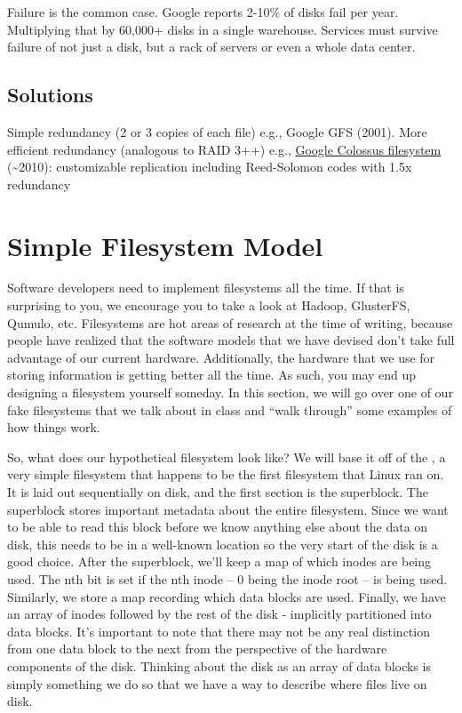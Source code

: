 Failure is the common case.
Google reports 2-10\% of disks fail per year.
Multiplying that by 60,000+ disks in a single warehouse.
Services must survive failure of not just a disk, but a rack of servers or even a whole data center.

\subsection{Solutions}
Simple redundancy (2 or 3 copies of each file) e.g., Google GFS (2001).
More efficient redundancy (analogous to RAID 3++) e.g., \href{http://goo.gl/LwFIy}{Google Colossus filesystem} (\textasciitilde{}2010): customizable replication including Reed-Solomon codes with 1.5x redundancy

\section{Simple Filesystem Model}

Software developers need to implement filesystems all the time.
If that is surprising to you, we encourage you to take a look at Hadoop, GlusterFS, Qumulo, etc.
Filesystems are hot areas of research at the time of writing, because people have realized that the software models that we have devised don't take full advantage of our current hardware.
Additionally, the hardware that we use for storing information is getting better all the time.
As such, you may end up designing a filesystem yourself someday.
In this section, we will go over one of our fake filesystems that we talk about in class and ``walk through'' some examples of how things work.

So, what does our hypothetical filesystem look like? 
We will base it off of the , a very simple filesystem that happens to be the first filesystem that Linux ran on.
It is laid out sequentially on disk, and the first section is the superblock.
The superblock stores important metadata about the entire filesystem.
Since we want to be able to read this block before we know anything else about the data on disk, this needs to be in a well-known location so the very start of the disk is a good choice.
After the superblock, we'll keep a map of which inodes are being used.
The nth bit is set if the nth inode -- $0$ being the inode root -- is being used.
Similarly, we store a map recording which data blocks are used.
Finally, we have an array of inodes followed by the rest of the disk - implicitly partitioned into data blocks.
It's important to note that there may not be any real distinction from one data block to the next from the perspective of the hardware components of the disk.
Thinking about the disk as an array of data blocks is simply something we do so that we have a way to describe where files live on disk.

